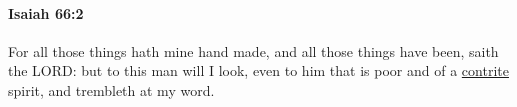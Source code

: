 
		\paragraph{Isaiah 66:2} %
			\label{ISAIAH-66-2}

			For all those things hath mine hand made, and all those things have been, saith the LORD: but to this man will I look, even to him that is poor and of a \hyperref[CONTRITE]{contrite} spirit, and trembleth at my word.


